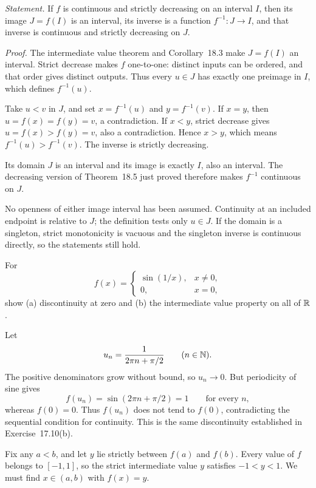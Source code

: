 \emph{Statement.} If $f$ is continuous and strictly decreasing
on an interval $I$, then its image $J=f(I)$ is an interval,
its inverse is a function $f^{-1}:J\to I$, and that inverse
is continuous and strictly decreasing on $J$.

\emph{Proof.} The intermediate value theorem and Corollary~18.3
make $J=f(I)$ an interval. Strict decrease makes $f$ one-to-one:
distinct inputs can be ordered, and that order gives distinct
outputs. Thus every $u\in J$ has exactly one preimage in $I$,
which defines $f^{-1}(u)$.

Take $u<v$ in $J$, and set $x=f^{-1}(u)$ and $y=f^{-1}(v)$.
If $x=y$, then $u=f(x)=f(y)=v$, a contradiction.
If $x<y$, strict decrease gives $u=f(x)>f(y)=v$, also a
contradiction. Hence $x>y$, which means
$f^{-1}(u)>f^{-1}(v)$. The inverse is strictly decreasing.

Its domain $J$ is an interval and its image is exactly $I$,
also an interval. The decreasing version of Theorem~18.5 just
proved therefore makes $f^{-1}$ continuous on $J$.

No openness of either image interval has been assumed.
Continuity at an included endpoint is relative to $J$; the
definition tests only $u\in J$. If the domain is a singleton,
strict monotonicity is vacuous and the singleton inverse is
continuous directly, so the statements still hold.

\goal For
\[
 f(x)=\begin{cases}\sin(1/x),&x\ne0,\\0,&x=0,\end{cases}
\]
show (a) discontinuity at zero and (b) the intermediate value
property on all of $\mathbb{R}$.

Let
\[
 u_n=\frac1{2\pi n+\pi/2}\qquad(n\in\mathbb{N}).
\]
The positive denominators grow without bound, so $u_n\to0$.
But periodicity of sine gives
\[
 f(u_n)=\sin(2\pi n+\pi/2)=1
 \qquad\text{for every }n,
\]
whereas $f(0)=0$. Thus $f(u_n)$ does not tend to $f(0)$,
contradicting the sequential condition for continuity.
This is the same discontinuity established in Exercise~17.10(b).

Fix any $a<b$, and let $y$ lie strictly between $f(a)$ and
$f(b)$. Every value of $f$ belongs to $[-1,1]$, so the strict
intermediate value $y$ satisfies $-1<y<1$.
We must find $x\in(a,b)$ with $f(x)=y$.

